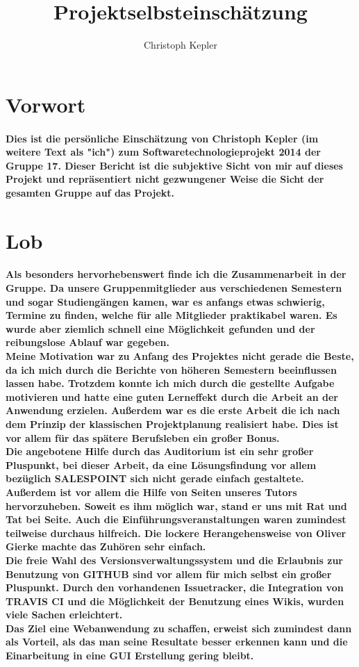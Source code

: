 \documentclass[a4paper]{article}
\author{Christoph Kepler}
\date{}
\title{
\normalfont
\normalsize
\huge{Projektselbsteinschätzung}
}
\begin{document}
\maketitle
\tableofcontents

\newpage

\section{Vorwort}

\paragraph{Dies ist die persönliche Einschätzung von Christoph Kepler (im weitere Text als "ich") zum Softwaretechnologieprojekt 2014 der Gruppe 17. Dieser Bericht ist die subjektive Sicht von mir auf dieses Projekt und repräsentiert nicht gezwungener Weise die Sicht der gesamten Gruppe auf das Projekt.}

\section{Lob}

\paragraph{Als besonders hervorhebenswert finde ich die Zusammenarbeit in der Gruppe. Da unsere Gruppenmitglieder aus verschiedenen Semestern und sogar Studiengängen kamen, war es anfangs etwas schwierig, Termine zu finden, welche für alle Mitglieder praktikabel waren. Es wurde aber ziemlich schnell eine Möglichkeit gefunden und der reibungslose Ablauf war gegeben.\\
Meine Motivation war zu Anfang des Projektes nicht gerade die Beste, da ich mich durch die Berichte von höheren Semestern beeinflussen lassen habe. Trotzdem konnte ich mich durch die gestellte Aufgabe motivieren und hatte eine guten Lerneffekt durch die Arbeit an der Anwendung erzielen. Außerdem war es die erste Arbeit die ich nach dem Prinzip der klassischen Projektplanung realisiert habe. Dies ist vor allem für das spätere Berufsleben ein großer Bonus.\\
Die angebotene Hilfe durch das Auditorium ist ein sehr großer Pluspunkt, bei dieser Arbeit, da eine Lösungsfindung vor allem bezüglich SALESPOINT sich nicht gerade einfach gestaltete. Außerdem ist vor allem die Hilfe von Seiten unseres Tutors hervorzuheben. Soweit es ihm möglich war, stand er uns mit Rat und Tat bei Seite. Auch die Einführungsveranstaltungen waren zumindest teilweise durchaus hilfreich. Die lockere Herangehensweise von Oliver Gierke machte das Zuhören sehr einfach.\\
Die freie Wahl des Versionsverwaltungssystem und die Erlaubnis zur Benutzung von GITHUB sind vor allem für mich selbst ein großer Pluspunkt. Durch den vorhandenen Issuetracker, die Integration von TRAVIS CI und die Möglichkeit der Benutzung eines Wikis, wurden viele Sachen erleichtert.\\
Das Ziel eine Webanwendung zu schaffen, erweist sich zumindest dann als Vorteil, als das man seine Resultate besser erkennen kann und die Einarbeitung in eine GUI Erstellung gering bleibt.}
\end{document}
